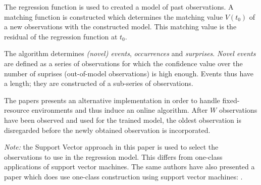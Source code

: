 The regression function is used to created a model of past observations.
A matching function is constructed which determines the matching value $V(t_0)$ of a new observations with the constructed model.
This matching value is the residual of the regression function at $t_0$.

The algorithm determines \emph{(novel) events}, \emph{occurrences} and \emph{surprises}.
\emph{Novel events} are defined as a series of observations for which the confidence value over the number of suprises (out-of-model observations) is high enough.
Events thus have a length; they are constructed of a sub-series of observations.

The papers presents an alternative implementation in order to handle fixed-resource environments and thus induce an online algorithm.
After $W$ observations have been observed and used for the trained model, the oldest observation is disregarded before the newly obtained observation is incorporated.

\emph{Note:} the Support Vector approach in this paper is used to select the observations to use in the regression model.
This differs from one-class applications of support vector machines.
The same authors have also presented a paper which does use one-class construction using support vector machines: \cite{ma2003time}.